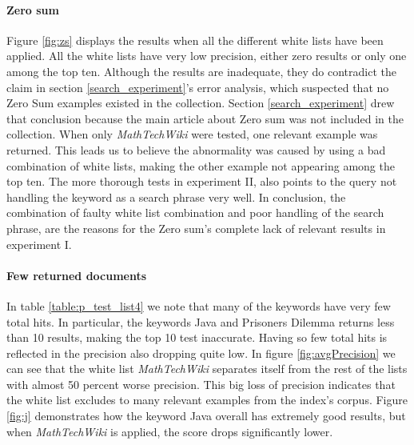 \paragraph{Zero sum}
Figure \ref{fig:zs} displays the results when all the different white lists have been applied. All the white lists have very low precision, either zero results or only one among the top ten. Although the results are inadequate, they do contradict the claim in section \ref{search_experiment}'s error analysis, which suspected that no Zero Sum examples existed in the collection. Section \ref{search_experiment} drew that conclusion because the main article about Zero sum was not included in the collection. When only \textit{MathTechWiki} were tested, one relevant example was returned. This leads us to believe the abnormality was caused by using a bad combination of white lists, making the other example not appearing among the top ten. The more thorough tests in experiment II, also points to the query not handling the keyword as a search phrase very well. In conclusion, the combination of faulty white list combination and poor handling of the search phrase, are the reasons for the Zero sum's complete lack of relevant results in experiment I.

\paragraph{Few returned documents}
In table \ref{table:p_test_list4} we note that many of the keywords have very few total hits. In particular, the keywords Java and Prisoners Dilemma returns less than 10 results, making the top 10 test inaccurate. Having so few total hits is reflected in the precision also dropping quite low. In figure \ref{fig:avgPrecision} we can see that the white list \textit{MathTechWiki} separates itself from the rest of the lists with almost 50 percent worse precision. This big loss of precision indicates that the white list excludes to many relevant examples from the index's corpus. Figure \ref{fig:j} demonstrates how the keyword Java overall has extremely good results, but when \textit{MathTechWiki} is applied, the score drops significantly lower.

